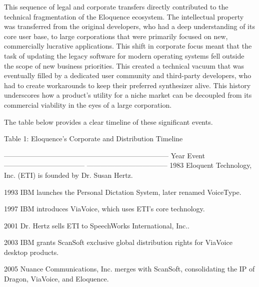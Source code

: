 This sequence of legal and corporate transfers directly contributed to
the technical fragmentation of the Eloquence ecosystem. The intellectual
property was transferred from the original developers, who had a deep
understanding of its core user base, to large corporations that were
primarily focused on new, commercially lucrative applications.\supercite{1} This
shift in corporate focus meant that the task of updating the legacy
software for modern operating systems fell outside the scope of new
business priorities. This created a technical vacuum that was eventually
filled by a dedicated user community and third-party developers, who had
to create workarounds to keep their preferred synthesizer alive. This
history underscores how a product's utility for a niche market can be
decoupled from its commercial viability in the eyes of a large
corporation.

The table below provides a clear timeline of these significant events.

Table 1: Eloquence's Corporate and Distribution Timeline

  -----------------------------------------------------------------------
  Year                                Event
  ----------------------------------- -----------------------------------
  1983                                Eloquent Technology, Inc. (ETI) is
                                      founded by Dr. Susan Hertz.\supercite{1}

  1993                                IBM launches the Personal Dictation
                                      System, later renamed VoiceType.\supercite{7}

  1997                                IBM introduces ViaVoice, which uses
                                      ETI's core technology.\supercite{7}

  2001                                Dr. Hertz sells ETI to SpeechWorks
                                      International, Inc..\supercite{1}

  2003                                IBM grants ScanSoft exclusive
                                      global distribution rights for
                                      ViaVoice desktop products.\supercite{7}

  2005                                Nuance Communications, Inc. merges
                                      with ScanSoft, consolidating the IP
                                      of Dragon, ViaVoice, and
                                      Eloquence.\supercite{7}

